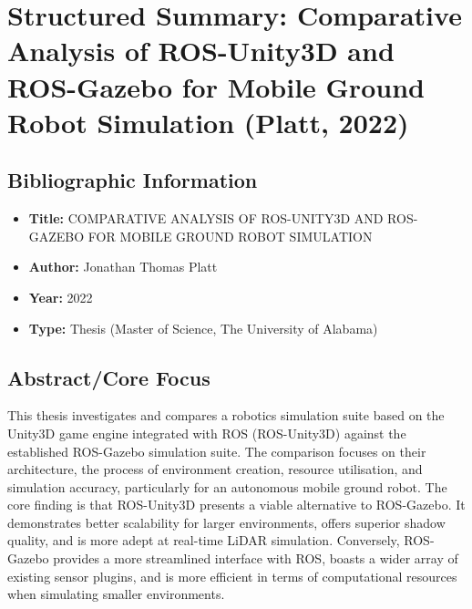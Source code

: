 \section{Structured Summary: Comparative Analysis of ROS-Unity3D and ROS-Gazebo for Mobile Ground Robot Simulation (Platt, 2022)}\label{sec:structured-summary:-comparative-analysis-of-ros-unity3d-and-ros-gazebo-for-mobile-ground-robot-simulation-(platt-2022)}

\subsection{Bibliographic Information}\label{subsec:bibliographic-information}
\begin{itemize}
    \item \textbf{Title:} COMPARATIVE ANALYSIS OF ROS-UNITY3D AND ROS-GAZEBO FOR MOBILE GROUND ROBOT SIMULATION
    \item \textbf{Author:} Jonathan Thomas Platt
    \item \textbf{Year:} 2022
    \item \textbf{Type:} Thesis (Master of Science, The University of Alabama)
\end{itemize}

\subsection{Abstract/Core Focus}\label{subsec:abstract/core-focus}
This thesis investigates and compares a robotics simulation suite based on the Unity3D game engine integrated with ROS (ROS-Unity3D) against the established ROS-Gazebo simulation suite.
The comparison focuses on their architecture, the process of environment creation, resource utilisation, and simulation accuracy, particularly for an autonomous mobile ground robot.
The core finding is that ROS-Unity3D presents a viable alternative to ROS-Gazebo.
It demonstrates better scalability for larger environments, offers superior shadow quality, and is more adept at real-time LiDAR simulation.
Conversely, ROS-Gazebo provides a more streamlined interface with ROS, boasts a wider array of existing sensor plugins, and is more efficient in terms of computational resources when simulating smaller environments.

